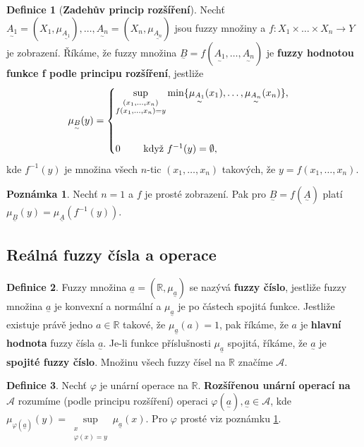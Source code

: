 \documentclass[a4]{report}
\newcommand{\fA}{\underset{^\sim}A}
\newcommand{\fB}{\underset{^\sim}B}
\newcommand{\muA}{\mu_{\fA}}
\newcommand{\muB}{\mu_{\fB}}
\newcommand{\fa}{\underset{^\sim}a}
\newcommand{\mua}{\mu_{\fa}}
\theoremstyle{definition}
\newtheorem{definition}{Definice}[section]
\newtheorem{remark}{Poznámka}[section]
\begin{document}
{\begin{definition}[\textbf{Zadehův princip rozšíření}]
Nechť $\underset{^\sim}{A_1} = (X_1, \mu_{\underset{^\sim}{A_1}}), \ldots, \underset{^\sim}{A_n} = (X_n, \mu_{\underset{^\sim}{A_n}})$ jsou fuzzy množiny a $f: X_1 \times \ldots \times X_n \rightarrow Y$ je zobrazení. Říkáme, že fuzzy množina $\fB = f(\underset{^\sim}{A_1}, \ldots, \underset{^\sim}{A_n})$ je \textbf{fuzzy hodnotou funkce f podle principu rozšíření}, jestliže
\begin{equation*}
\muB(y)=
 \begin{cases}
\sup\limits_{\substack{(x_1, \ldots, x_n) \\ f(x_1, \ldots, x_n)=y}} \min\lbrace \mu_{\underset{^\sim}{A_1}}(x_1), \ldots, \mu_{\underset{^\sim}{A_n}}(x_n) \rbrace, \\
\bigskip
\\
 0\qquad \text{ když }  f^{-1}(y) = \emptyset, 
  \end{cases}
\end{equation*}
kde $f^{-1}(y)$ je množina všech $n$-tic $(x_1, \ldots, x_n)$ takových, že $y = f(x_1, \ldots, x_n)$.
\end{definition}

\begin{remark}\label{prosty-zadeh}
Nechť $n=1$ a $f$ je prosté zobrazení. Pak pro $\fB = f(\fA)$ platí $\muB(y)=\muA(f^{-1}(y))$.
\end{remark}



\subsection{Reálná fuzzy čísla a operace}

\begin{definition}
Fuzzy množina $\fa = (\mathbb{R}, \mua)$ se nazývá \textbf{fuzzy číslo}, jestliže fuzzy množina $\fa$ je konvexní a normální a $\mua$ je po částech spojitá funkce. Jestliže existuje právě jedno $a \in \mathbb{R}$ takové, že $\mua(a)=1$, pak říkáme, že $a$ je \textbf{hlavní hodnota} fuzzy čísla $\fa$. Je-li funkce příslušnosti $\mua$ spojitá, říkáme, že $\fa$ je \textbf{spojité fuzzy číslo}. Množinu všech fuzzy čísel na $\mathbb{R}$ značíme $\mathcal{A}$. 
\end{definition}

\begin{definition}
Nechť $\varphi$ je unární operace na $\mathbb{R}$. \textbf{Rozšířenou unární operací na} $\mathcal{A}$ rozumíme (podle principu rozšíření) operaci $\varphi(\fa), \fa \in \mathcal{A}$, kde $\mu_{\varphi(\fa)}(y) = \sup\limits_{\substack{x \\ \varphi(x)=y}} \mua(x)$. Pro $\varphi$ prosté viz poznámku \ref{prosty-zadeh}.
\end{definition}

}
\end{document}
